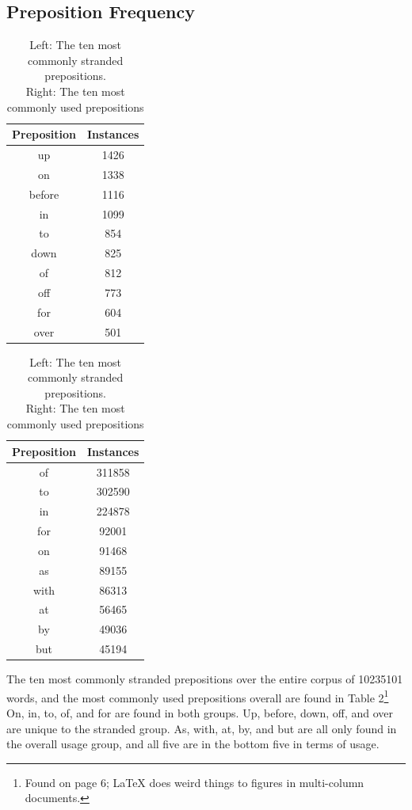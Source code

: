 \documentclass[DIV=calc, paper=letter, fontsize=12pt]{scrartcl}	 %
\begin{document}
\begin{multicols}{2}
\subsection{Preposition Frequency}

\begin{table}[t]
  \centering
   \caption{Left: The ten most commonly stranded prepositions. \\Right: The ten most commonly used prepositions}
  \begin{tabular}{c | c }
    Preposition & Instances \\ \hline
    up & 1426 \\
    on & 1338 \\
    before & 1116 \\
    in & 1099 \\
    to & 854 \\
    down & 825 \\
    of & 812 \\
    off & 773 \\
    for & 604 \\
    over & 501\\
  \end{tabular}
    \begin{tabular}{c | c }
    Preposition & Instances \\ \hline
    	of	& 311858 \\
to	& 302590\\
in	& 224878\\
for	& 92001\\
on	& 91468\\
as	& 89155\\
with	& 86313\\
at	& 56465\\
by	& 49036\\
but	& 45194\\
    
  \end{tabular}

\end{table}


The ten most commonly stranded prepositions over the entire corpus of 10235101 words, and the most commonly used prepositions overall are found in Table 2\footnote{Found on page 6; LaTeX does weird things to figures in multi-column documents.}
On, in, to, of, and for are found in both groups. Up, before, down, off, and over are unique to the stranded group. As, with, at, by, and but are all only found in the overall usage group, and all five are 
in the bottom five in terms of usage. 


\end{multicols}
\end{document}

